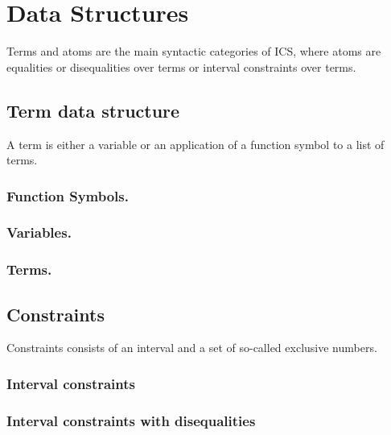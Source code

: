 \documentclass[12pt]{article}
\begin{document}
\section{Data Structures}\label{sec:terms}

Terms and atoms are the main syntactic categories of ICS,
where atoms are equalities or disequalities over terms
or interval constraints over terms.

\subsection{Term data structure}\label{subsec:terms}

A term is either a variable or an application of a function
symbol to a list of terms. 

\subsubsection{Function Symbols.}
  
  

  \subsubsection{Variables.}
  
  


  \subsubsection{Terms.}
  
  


 \subsection{Constraints}\label{sec:cnstrnts}
  Constraints consists of an interval and a set of 
  so-called exclusive numbers. 

 \subsubsection{Interval constraints}\label{subsec:interval}
  
  
  
  

 \subsubsection{Interval constraints with disequalities}\label{subsec:cnstrnts}
  
  
\end{document}
